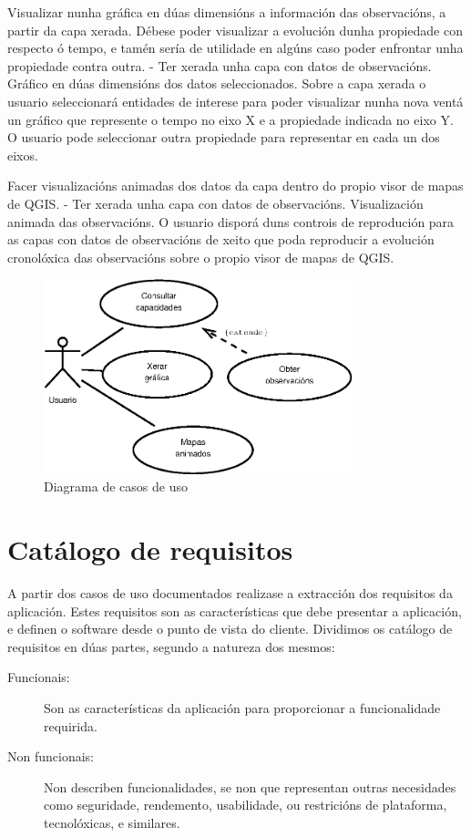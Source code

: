 			{Visualizar nunha gráfica en dúas dimensións a información das observacións, a partir da capa xerada. Débese poder visualizar a evolución dunha propiedade con respecto ó tempo, e tamén sería de utilidade en algúns caso poder enfrontar unha propiedade contra outra. } %
			{-} %
			{Ter xerada unha capa con datos de observacións.} %
			{Gráfico en dúas dimensións dos datos seleccionados.} %
			{Sobre a capa xerada o usuario seleccionará entidades de interese para poder visualizar nunha nova ventá un gráfico que represente o tempo no eixo X e a propiedade indicada no eixo Y. O usuario pode seleccionar outra propiedade para representar en cada un dos eixos.
			} %
			
			{Facer visualizacións animadas dos datos da capa dentro do propio visor de mapas de QGIS.} %
			{-} %
			{Ter xerada unha capa con datos de observacións.} %
			{Visualización animada das observacións.} %
			{O usuario disporá duns controis de reprodución para as capas con datos de observacións de xeito que poda reproducir a evolución cronolóxica das observacións sobre o propio visor de mapas de QGIS. 
			} %

\begin{figure}[hbtp]
\centering
\includegraphics[width=0.8\textwidth]{images/uc.eps}
\caption{Diagrama de casos de uso}
\label{fig:uc} 
\end{figure}

\section{Catálogo de requisitos}
A partir dos casos de uso documentados realizase a extracción dos requisitos da aplicación. Estes requisitos son as características que debe presentar a aplicación, e definen o software desde o punto de vista do cliente. Dividimos os catálogo de requisitos en dúas partes, segundo a natureza dos mesmos:
\begin{description}
\item[Funcionais:] Son as características da aplicación para proporcionar a funcionalidade requirida.
\item[Non funcionais:] Non describen funcionalidades, se non que representan outras necesidades como seguridade, rendemento, usabilidade, ou restricións de plataforma, tecnolóxicas, e similares.
\end{description}

